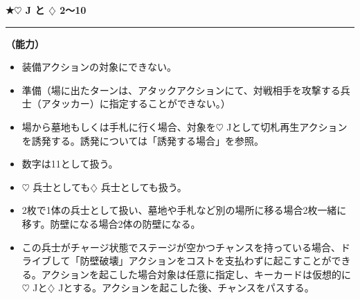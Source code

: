 \documentclass[twocolumn,a5paper,papersize,10pt]{jarticle}
\begin{document}
 
\vspace{2mm}
\begin{tcolorbox}[title={\small\bf【Character】チャリオット}{\scriptsize （兵士）}]

  {\scriptsize\bf ★{\normalsize $\heartsuit$} J と {\normalsize $\diamondsuit$} 2〜10}

\vspace{1mm} %
\hrule height 0.1mm depth 0mm width 62mm %
\vspace{1mm} %

{\bf（能力）}


\vspace{-1zh}%
\begin{itemize}
\setlength{\leftskip}{-0.3cm}
\setlength{\parskip}{0pt} %

\item 装備アクションの対象にできない。

\item 準備（場に出たターンは、アタックアクションにて、対戦相手を攻撃する兵士（アタッカー）に指定することができない。）

\item 場から墓地もしくは手札に行く場合、対象を{\normalsize $\heartsuit$} Jとして切札再生アクションを誘発する。誘発については「誘発する場合」を参照。

\item 数字は11として扱う。

\item {\normalsize $\heartsuit$} 兵士としても{\normalsize $\diamondsuit$} 兵士としても扱う。

\item 2枚で1体の兵士として扱い、墓地や手札など別の場所に移る場合2枚一緒に移す。防壁になる場合2体の防壁になる。

\item この兵士がチャージ状態でステージが空かつチャンスを持っている場合、ドライブして「防壁破壊」アクションをコストを支払わずに起こすことができる。アクションを起こした場合対象は任意に指定し、キーカードは仮想的に{\normalsize $\heartsuit$} Jと{\normalsize $\diamondsuit$} Jとする。アクションを起こした後、チャンスをパスする。
\vspace{-1zh}%
\end{itemize}

\vspace{1mm} %
\end{tcolorbox}
\end{document}
